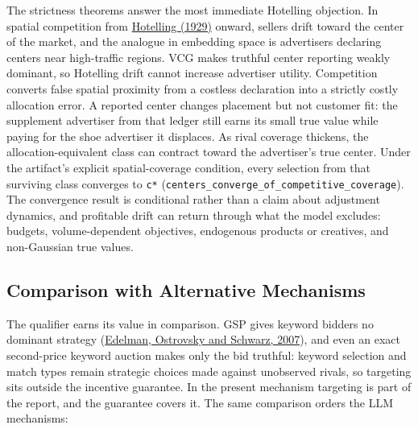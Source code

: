 The strictness theorems answer the most immediate Hotelling objection.
In spatial competition from
\href{https://doi.org/10.2307/2224214}{Hotelling (1929)} onward, sellers
drift toward the center of the market, and the analogue in embedding
space is advertisers declaring centers near high-traffic regions. VCG
makes truthful center reporting weakly dominant, so Hotelling drift
cannot increase advertiser utility. Competition converts false spatial
proximity from a costless declaration into a strictly costly allocation
error. A reported center changes placement but not customer fit: the
supplement advertiser from that ledger still earns its small true value
while paying for the shoe advertiser it displaces. As rival coverage
thickens, the allocation-equivalent class can contract toward the
advertiser's true center. Under the artifact's explicit spatial-coverage
condition, every selection from that surviving class converges to
\texttt{c*} (\texttt{centers\_converge\_of\_competitive\_coverage}). The
convergence result is conditional rather than a claim about adjustment
dynamics, and profitable drift can return through what the model
excludes: budgets, volume-dependent objectives, endogenous products or
creatives, and non-Gaussian true values.

\subsection{Comparison with Alternative
Mechanisms}\label{comparison-with-alternative-mechanisms}

The qualifier earns its value in comparison. GSP gives keyword bidders
no dominant strategy
(\href{https://www.aeaweb.org/articles?id=10.1257/aer.97.1.242}{Edelman,
Ostrovsky and Schwarz, 2007}), and even an exact second-price keyword
auction makes only the bid truthful: keyword selection and match types
remain strategic choices made against unobserved rivals, so targeting
sits outside the incentive guarantee. In the present mechanism targeting
is part of the report, and the guarantee covers it. The same comparison
orders the LLM mechanisms:

